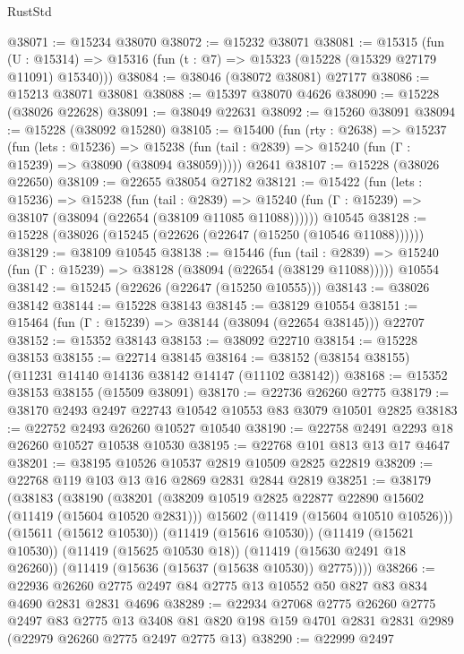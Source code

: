 \begin{lexlean}{RustStd}
\begin{coremodule}
@38071 := @15234 @38070
@38072 := @15232 @38071
@38081 := @15315
    (fun (U : @15314) => @15316 (fun (t : @7) => @15323 (@15228 (@15329 @27179 @11091) @15340)))
@38084 := @38046 (@38072 @38081) @27177
@38086 := @15213 @38071 @38081
@38088 := @15397 @38070 @4626
@38090 := @15228 (@38026 @22628)
@38091 := @38049 @22631
@38092 := @15260 @38091
@38094 := @15228 (@38092 @15280)
@38105 := @15400
    (fun (rty : @2638) =>
    @15237
      (fun (lets : @15236) =>
      @15238 (fun (tail : @2839) => @15240 (fun (Γ : @15239) => @38090 (@38094 @38059)))))
    @2641
@38107 := @15228 (@38026 @22650)
@38109 := @22655 @38054 @27182
@38121 := @15422
    (fun (lets : @15236) =>
    @15238
      (fun (tail : @2839) =>
      @15240 (fun (Γ : @15239) => @38107 (@38094 (@22654 (@38109 @11085 @11088))))))
    @10545
@38128 := @15228 (@38026 (@15245 (@22626 (@22647 (@15250 (@10546 @11088))))))
@38129 := @38109 @10545
@38138 := @15446
    (fun (tail : @2839) => @15240 (fun (Γ : @15239) => @38128 (@38094 (@22654 (@38129 @11088)))))
    @10554
@38142 := @15245 (@22626 (@22647 (@15250 @10555)))
@38143 := @38026 @38142
@38144 := @15228 @38143
@38145 := @38129 @10554
@38151 := @15464 (fun (Γ : @15239) => @38144 (@38094 (@22654 @38145))) @22707
@38152 := @15352 @38143
@38153 := @38092 @22710
@38154 := @15228 @38153
@38155 := @22714 @38145
@38164 := @38152 (@38154 @38155) (@11231 @14140 @14136 @38142 @14147 (@11102 @38142))
@38168 := @15352 @38153 @38155 (@15509 @38091)
@38170 := @22736 @26260 @2775
@38179 := @38170 @2493 @2497 @22743 @10542 @10553 @83 @3079 @10501 @2825
@38183 := @22752 @2493 @26260 @10527 @10540
@38190 := @22758 @2491 @2293 @18 @26260 @10527 @10538 @10530
@38195 := @22768 @101 @813 @13 @17 @4647
@38201 := @38195 @10526 @10537 @2819 @10509 @2825 @22819
@38209 := @22768 @119 @103 @13 @16 @2869 @2831 @2844 @2819
@38251 := @38179
    (@38183
      (@38190
        (@38201
          (@38209 @10519 @2825 @22877 @22890 @15602 (@11419 (@15604 @10520 @2831)))
          @15602
          (@11419 (@15604 @10510 @10526)))
        (@15611 (@15612 @10530))
        (@11419 (@15616 @10530))
        (@11419 (@15621 @10530))
        (@11419 (@15625 @10530 @18))
        (@11419 (@15630 @2491 @18 @26260))
        (@11419 (@15636 (@15637 (@15638 @10530)) @2775))))
@38266 := @22936 @26260 @2775 @2497 @84 @2775 @13 @10552 @50 @827 @83 @834 @4690 @2831 @2831 @4696
@38289 := @22934
    @27068
    @2775
    @26260
    @2775
    @2497
    @83
    @2775
    @13
    @3408
    @81
    @820
    @198
    @159
    @4701
    @2831
    @2831
    @2989
    (@22979 @26260 @2775 @2497 @2775 @13)
@38290 := @22999 @2497

\end{coremodule}
\end{lexlean}
